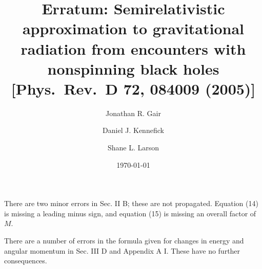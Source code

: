 \documentclass[aps,prd,amsfonts,amssymb,amsmath,nofootinbib,reprint,showpacs]{revtex4-1}
\begin{document}

\title{Erratum: Semirelativistic approximation to gravitational radiation from encounters
with nonspinning black holes \\ {[Phys.\ Rev.\ D 72, 084009 (2005)]}}

\author{Jonathan R. Gair}
\author{Daniel J. Kennefick}
\author{Shane L. Larson}

\date{\today}


\maketitle

There are two minor errors in Sec. II B; these are not propagated. Equation (14) is missing a leading minus sign, and equation (15) is missing an overall factor of $M$.

There are a number of errors in the formula given for changes in energy and angular momentum in Sec. III D and Appendix A I. These have no further consequences.
\end{document}
